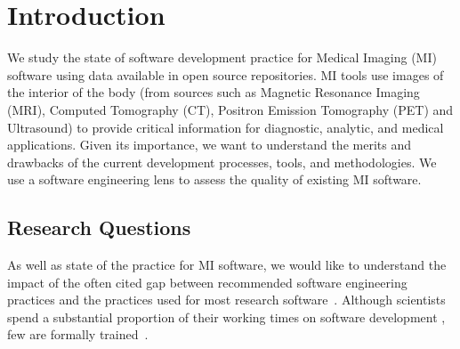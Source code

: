 \documentclass[doubleblind,12pt, 3p, times]{elsarticle}
\begin{document}

\section{Introduction} \label{ch_intro}

We study the state of software development practice for Medical Imaging
(MI) software using data available in open source repositories.  MI tools use
images of the interior of the body (from sources such as Magnetic Resonance
Imaging (MRI), Computed Tomography (CT), Positron Emission Tomography (PET) and
Ultrasound) to provide critical information for diagnostic, analytic, and medical
applications. Given its importance, we want to understand the merits and
drawbacks of the current development processes, tools, and methodologies. We
use a software engineering lens to assess the quality of existing MI software.

\subsection{Research Questions} \label{sec_motivation}

As well as state of the practice for MI software, we would like to understand
the impact of the often cited gap between recommended software engineering
practices and the practices used for most research software~\cite{Storer2017}. Although
scientists spend a substantial proportion of their working times on software
development \cite{Hannay2009, Prabhu2011}, few are formally
trained~\cite{Hannay2009}.
\end{document}

